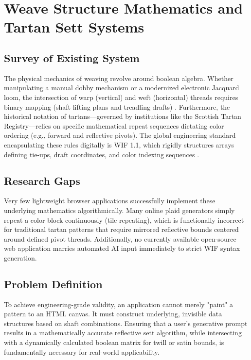\section{Weave Structure Mathematics and Tartan Sett Systems}

\subsection{Survey of Existing System}
The physical mechanics of weaving revolve around boolean algebra. Whether manipulating a manual dobby mechanism or a modernized electronic Jacquard loom, the intersection of warp (vertical) and weft (horizontal) threads requires binary mapping (shaft lifting plans and treadling drafts) \cite{ref9}. Furthermore, the historical notation of tartans—governed by institutions like the Scottish Tartan Registry—relies on specific mathematical repeat sequences dictating color ordering (e.g., forward and reflective pivots). The global engineering standard encapsulating these rules digitally is WIF 1.1, which rigidly structures arrays defining tie-ups, draft coordinates, and color indexing sequences \cite{ref10}. 

\subsection{Research Gaps}
Very few lightweight browser applications successfully implement these underlying mathematics algorithmically. Many online plaid generators simply repeat a color block continuously (tile repeating), which is functionally incorrect for traditional tartan patterns that require mirrored reflective bounds centered around defined pivot threads. Additionally, no currently available open-source web application marries automated AI input immediately to strict WIF syntax generation. 

\subsection{Problem Definition}
To achieve engineering-grade validity, an application cannot merely "paint" a pattern to an HTML canvas. It must construct underlying, invisible data structures based on shaft combinations. Ensuring that a user's generative prompt results in a mathematically accurate reflective sett algorithm, while intersecting with a dynamically calculated boolean matrix for twill or satin bounds, is fundamentally necessary for real-world applicability.

